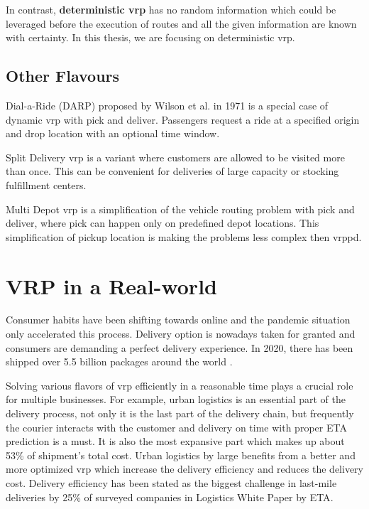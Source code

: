     In contrast, \textbf{deterministic \gls{vrp}} has no random information which could be leveraged before the execution of routes and all the given information are known with certainty. In this thesis, we are focusing on deterministic \gls{vrp}.
    
    \subsection{Other Flavours}
    Dial-a-Ride (DARP) proposed by Wilson et al. \cite{darp-proposed} in 1971 is a special case of dynamic \gls{vrp} with pick and deliver. Passengers request a ride at a specified origin and drop location with an optional time window. 
    
    Split Delivery \gls{vrp} \cite{split-deliver} is a variant where customers are allowed to be visited more than once. This can be convenient for deliveries of large capacity or stocking fulfillment centers.
    
    Multi Depot \gls{vrp} is a simplification of the vehicle routing problem with pick and deliver, where pick can happen only on predefined depot locations. This simplification of pickup location is making the problems less complex then \gls{vrppd}.
    
\section{VRP in a Real-world}
Consumer habits have been shifting towards online and the pandemic situation only accelerated this process. Delivery option is nowadays taken for granted and consumers are demanding a perfect delivery experience. In 2020, there has been shipped over 5.5 billion packages around the world \cite{num-shipped-packages}.

Solving various flavors of \gls{vrp} efficiently in a reasonable time plays a crucial role for multiple businesses. For example, urban logistics is an essential part of the delivery process, not only it is the last part of the delivery chain, but frequently the courier interacts with the customer and delivery on time with proper ETA prediction is a must. It is also the most expansive part which makes up about 53\% of shipment’s total cost\cite{last-mile-cost}. Urban logistics by large benefits from a better and more optimized \gls{vrp} which increase the delivery efficiency and reduces the delivery cost. Delivery efficiency has been stated as the biggest challenge in last-mile deliveries by 25\% of surveyed companies in Logistics White Paper by ETA\cite{logistics-whitepaper}.

